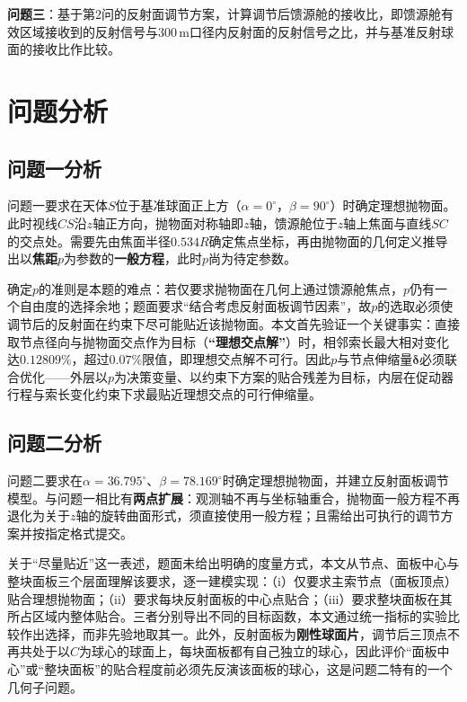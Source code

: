 \documentclass[withoutpreface]{cumcmthesis}
\begin{document}
\textbf{问题三}：基于第2问的反射面调节方案，计算调节后馈源舱的接收比，即馈源舱有效区域接收到的反射信号与$300\,\mathrm{m}$口径内反射面的反射信号之比，并与基准反射球面的接收比作比较。

\section{问题分析}

\subsection{问题一分析}

问题一要求在天体$S$位于基准球面正上方（$\alpha=0^{\circ}$，$\beta=90^{\circ}$）时确定理想抛物面。此时视线$CS$沿$z$轴正方向，抛物面对称轴即$z$轴，馈源舱位于$z$轴上焦面与直线$SC$的交点处。需要先由焦面半径$0.534R$确定焦点坐标，再由抛物面的几何定义推导出以\textbf{焦距}$p$为参数的\textbf{一般方程}，此时$p$尚为待定参数。

确定$p$的准则是本题的难点：若仅要求抛物面在几何上通过馈源舱焦点，$p$仍有一个自由度的选择余地；题面要求``结合考虑反射面板调节因素''，故$p$的选取必须使调节后的反射面在约束下尽可能贴近该抛物面。本文首先验证一个关键事实：直接取节点径向与抛物面交点作为目标（\textbf{``理想交点解''}）时，相邻索长最大相对变化达$0.12809\%$，超过$0.07\%$限值，即理想交点解不可行。因此$p$与节点伸缩量$\boldsymbol{\delta}$必须联合优化——外层以$p$为决策变量、以约束下方案的贴合残差为目标，内层在促动器行程与索长变化约束下求最贴近理想交点的可行伸缩量。

\subsection{问题二分析}

问题二要求在$\alpha=36.795^{\circ}$、$\beta=78.169^{\circ}$时确定理想抛物面，并建立反射面板调节模型。与问题一相比有\textbf{两点扩展}：观测轴不再与坐标轴重合，抛物面一般方程不再退化为关于$z$轴的旋转曲面形式，须直接使用一般方程；且需给出可执行的调节方案并按指定格式提交。

关于``尽量贴近''这一表述，题面未给出明确的度量方式，本文从节点、面板中心与整块面板三个层面理解该要求，逐一建模实现：（i）仅要求主索节点（面板顶点）贴合理想抛物面；（ii）要求每块反射面板的中心点贴合；（iii）要求整块面板在其所占区域内整体贴合。三者分别导出不同的目标函数，本文通过统一指标的实验比较作出选择，而非先验地取其一。此外，反射面板为\textbf{刚性球面片}，调节后三顶点不再共处于以$C$为球心的球面上，每块面板都有自己独立的球心，因此评价``面板中心''或``整块面板''的贴合程度前必须先反演该面板的球心，这是问题二特有的一个几何子问题。
\end{document}
